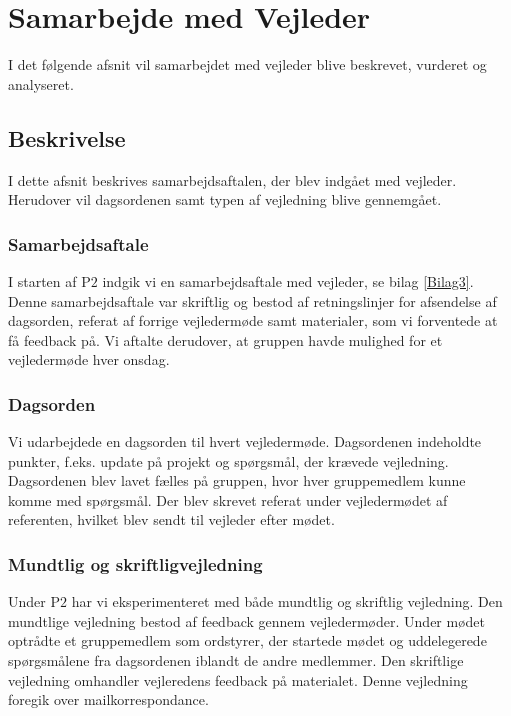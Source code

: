 \chapter{Samarbejde med Vejleder}
I det følgende afsnit vil samarbejdet med vejleder blive beskrevet, vurderet og analyseret. 

\section{Beskrivelse}
I dette afsnit beskrives samarbejdsaftalen, der blev indgået med vejleder. Herudover vil dagsordenen samt typen af vejledning blive gennemgået.

\subsection{Samarbejdsaftale}
I starten af P$2$ indgik vi en samarbejdsaftale med vejleder, se bilag \ref{Bilag3}. Denne samarbejdsaftale var skriftlig og bestod af retningslinjer for afsendelse af dagsorden, referat af forrige vejledermøde samt materialer, som vi forventede at få feedback på. Vi aftalte derudover, at gruppen havde mulighed for et vejledermøde hver onsdag.

\subsection{Dagsorden}
Vi udarbejdede en dagsorden til hvert vejledermøde. Dagsordenen indeholdte punkter, f.eks. update på projekt og spørgsmål, der krævede vejledning. Dagsordenen blev lavet fælles på gruppen, hvor hver gruppemedlem kunne komme med spørgsmål. Der blev skrevet referat under vejledermødet af referenten, hvilket blev sendt til vejleder efter mødet.

\subsection{Mundtlig og skriftligvejledning}
Under P$2$ har vi eksperimenteret med både mundtlig og skriftlig vejledning. Den mundtlige vejledning bestod af feedback gennem vejledermøder. Under mødet optrådte et gruppemedlem som ordstyrer, der startede mødet og uddelegerede spørgsmålene fra dagsordenen iblandt de andre medlemmer. Den skriftlige vejledning omhandler vejleredens feedback på materialet. Denne vejledning foregik over mailkorrespondance.


